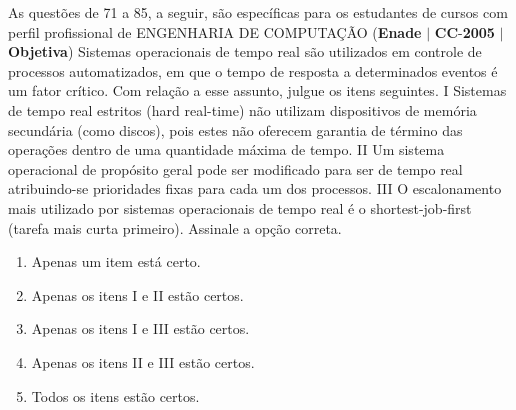 \documentclass{exam}
\begin{document}
\begin{questions}
As questões de 71 a 85, a seguir, são específicas para os estudantes de cursos com perfil profissional de
ENGENHARIA DE COMPUTAÇÃO
\question (\textbf{Enade} $|$ \textbf{CC}-\textbf{2005} $|$ \textbf{Objetiva})
Sistemas operacionais de tempo real são utilizados em controle
de processos automatizados, em que o tempo de resposta a
determinados eventos é um fator crítico. Com relação a esse
assunto, julgue os itens seguintes.
I Sistemas de tempo real estritos (hard real-time) não utilizam
dispositivos de memória secundária (como discos), pois estes
não oferecem garantia de término das operações dentro de
uma quantidade máxima de tempo.
II Um sistema operacional de propósito geral pode ser
modificado para ser de tempo real atribuindo-se prioridades
fixas para cada um dos processos.
III O escalonamento mais utilizado por sistemas operacionais de
tempo real é o shortest-job-first (tarefa mais curta primeiro).
Assinale a opção correta.
	\begin{enumerate}[label=\alph*)]
		\item  Apenas um item está certo.
		\item  Apenas os itens I e II estão certos.
		\item  Apenas os itens I e III estão certos.
		\item  Apenas os itens II e III estão certos.
		\item  Todos os itens estão certos.
	\end{enumerate}


\end{questions}
\end{document}
